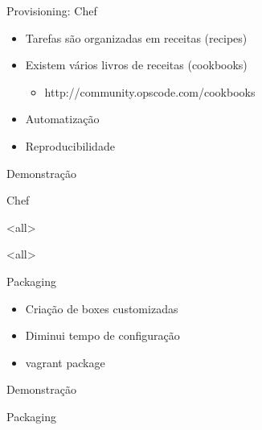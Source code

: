 \documentclass{beamer}
\begin{document}
\begin{frame}{Provisioning: Chef}
  \begin{itemize}
    \item Tarefas são organizadas em receitas (recipes)
    \item Existem vários livros de receitas (cookbooks)
    \begin{itemize}
      \item http://community.opscode.com/cookbooks
    \end{itemize}
    \item Automatização
    \item Reproducibilidade
  \end{itemize}
\end{frame}


\begin{frame}[plain,c]
  \begin{center}
    \Huge Demonstração
  \end{center}
  \begin{center}
    Chef
  \end{center}
\end{frame}

\mode<all>
{
\begin{frame}[plain]
\end{frame}}
\mode<all>{\usebackgroundtemplate{}}
\mode*

\begin{frame}{Packaging}
  \begin{itemize}
    \item Criação de boxes customizadas
    \item Diminui tempo de configuração
    \item vagrant package
  \end{itemize}
\end{frame}

\begin{frame}[plain,c]
  \begin{center}
    \Huge Demonstração
  \end{center}
  \begin{center}
    Packaging
  \end{center}
\end{frame}
\end{document}
